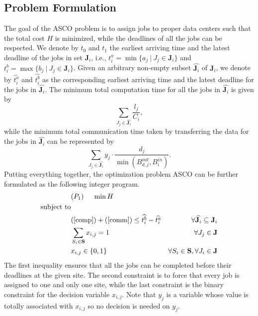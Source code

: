 \documentclass{article}
\begin{document}
\subsection{Problem Formulation}

The goal of the ASCO problem is to assign jobs to proper data centers such that the total cost $H$ is minimized, while the deadlines of all the jobs can be respected. We denote by $t_0$ and $t_1$ the earliest arriving time and the latest deadline of the jobs in set $\mathbf{J}_i$, i.e., $t^a_i = \min\{a_j~|~J_j \in \mathbf{J}_i\}$ and $t_i^b = \max\{b_j~|~J_j \in \mathbf{J}_i\}$. Given an arbitrary non-empty subset $\widehat{\mathbf{J}_i}$ of $\mathbf{J}_i$, we denote by $\widehat	{t^a_i}$ and $\widehat{t^b_i}$ as the corresponding earliest arriving time and the latest deadline for the jobs in $\widehat{\mathbf{J}_i}$. The minimum total computation time for all the jobs in $\widehat{\mathbf{J}_i}$ is given by
\begin{equation}
\sum_{J_j \in \widehat{\mathbf{J}_i}} \frac{l_j}{C_i}, \label{comp}
\end{equation}
while the minimum total communication time taken by transferring the data for the jobs in $\widehat{\mathbf{J}_i}$ can be represented by
\begin{equation}
\sum_{J_j \in \widehat{\mathbf{J}_i}} y_j \cdot \frac{d_j}{\min(B_{d,j}^{out}, B_i^{in})}. \label{comm}
\end{equation}
Putting everything together, the optimization problem ASCO can be further formulated as the following integer program.
\begin{equation}
\begin{aligned}
&(P_1)~~~~\min  H  \\
\text{subject to}  \\
 &(\ref{comp}) + (\ref{comm}) \leq \widehat{t_i^b} - \widehat{t_i^a} & \forall \widehat{\mathbf{J}_i} \subseteq \mathbf{J}_i  \\
&\sum_{S_i \in \mathbf{S}} x_{i, j} = 1 & \forall J_j \in \mathbf{J} \\
& x_{i,j} \in \{0, 1\} & \forall S_i \in \mathbf{S}, \forall J_i \in \mathbf{J} \\
\end{aligned}
\nonumber
\end{equation}
The first inequality ensures that all the jobs can be completed before their deadlines at the given site. The second constraint is to force that every job is assigned to one and only one site, while the last constraint is the binary constraint for the decision variable $x_{i,j}$. Note that $y_j$ is a variable whose value is totally associated with $x_{i,j}$ so no decision is needed on $y_j$.
\end{document}
